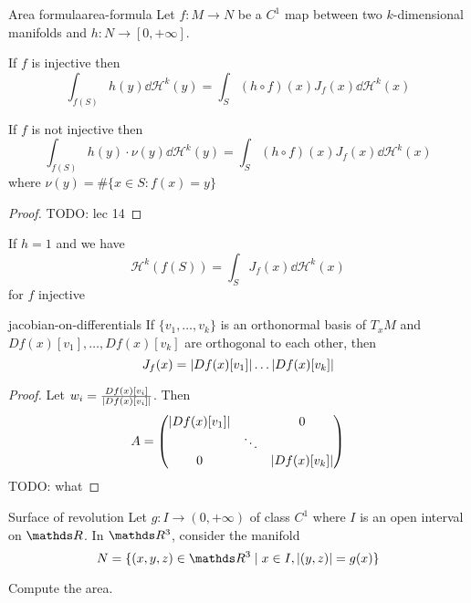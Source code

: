 \documentclass[12pt]{extarticle}
\begin{document}
\begin{theorem}{Area formula}{area-formula}
	Let $f: M \to N$ be a $C^1$ map between two $k$-dimensional manifolds and
	$h : N \to [0, + \infty]$.

	If $f$ is injective then
	\begin{equation}
		\int_{f(S)} h(y) \dd \mathcal H^k(y) = \int_S (h \circ f)(x) J_f(x) \dd \mathcal H^k(x)
	\end{equation}

	If $f$ is not injective then
	\begin{equation}
		\int_{f(S)} h(y) \cdot \nu(y) \dd \mathcal H^k(y) = \int_S (h \circ f)(x) J_f(x) \dd \mathcal H^k(x)
	\end{equation}
	where $\nu(y) = \# \{ x \in S : f(x) = y\}$
\end{theorem}

\begin{proof}
	TODO: lec 14
\end{proof}

\begin{corollary}{}{}
	If $h = 1$ and we have
	\begin{equation}
		\mathcal H^k(f(S)) = \int_S J_f(x) \dd \mathcal H^k(x)
	\end{equation}
	for $f$ injective
\end{corollary}

\begin{remark}{}{jacobian-on-differentials}
	If $\{v_1, \dots, v_k\}$ is an orthonormal basis of $T_xM$ and $Df(x)[v_1], \dots, Df(x)[v_k]$ are
	orthogonal to each other, then
	\begin{equation}
		J_f(x) = \abs{Df(x)[v_1]} \dots \abs{Df(x)[v_k]}
	\end{equation}
\end{remark}

\begin{proof}
	Let $w_i = \frac{Df(x)[v_i]}{\abs{Df(x)[v_i]}}$.
	Then
	\begin{equation}
		A = \begin{pmatrix}
			\abs{Df(x)[v_1]} &        & 0                \\
			                 & \ddots &                  \\
			0                &        & \abs{Df(x)[v_k]}
		\end{pmatrix}
	\end{equation}
	TODO: what
\end{proof}

\begin{example}{Surface of revolution}{}
	Let $g: I \to (0, +\infty)$ of class $C^1$ where $I$ is an open interval on $\R$.
	In $\R^3$, consider the manifold
	\begin{equation}
		N = \{ (x,y,z) \in \R^3 \mid x \in I, \abs{(y, z)} = g(x) \}
	\end{equation}

	Compute the area.
\end{example}
\end{document}
